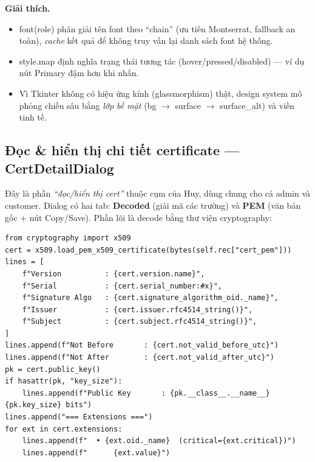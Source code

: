 \documentclass[12pt,a4paper]{article}
\newcommand{\code}[1]{{\ttfamily\small\def\_{\textunderscore\discretionary{}{}{}}#1}}
\begin{document}
\textbf{Giải thích.}
\begin{itemize}
  \item \code{font(role)} phân giải tên font theo ``chain'' (ưu tiên Montserrat,
        fallback an toàn), \emph{cache} kết quả để không truy vấn lại danh sách
        font hệ thống.
  \item \code{style.map} định nghĩa trạng thái tương tác (hover/pressed/disabled)
        — ví dụ nút Primary đậm hơn khi nhấn.
  \item Vì Tkinter không có hiệu ứng kính (glassmorphism) thật, design system mô
        phỏng chiều sâu bằng \emph{lớp bề mặt} (bg $\to$ surface $\to$ surface\_alt)
        và viền tinh tế.
\end{itemize}

\subsection{Đọc \& hiển thị chi tiết certificate — \code{CertDetailDialog}}

Đây là phần \emph{``đọc/hiển thị cert''} thuộc cụm của Huy, dùng chung cho cả
admin và customer. Dialog có hai tab: \textbf{Decoded} (giải mã các trường) và
\textbf{PEM} (văn bản gốc + nút Copy/Save). Phần lõi là decode bằng thư viện
\code{cryptography}:

\begin{Verbatim}
from cryptography import x509
cert = x509.load_pem_x509_certificate(bytes(self.rec["cert_pem"]))
lines = [
    f"Version          : {cert.version.name}",
    f"Serial           : {cert.serial_number:#x}",
    f"Signature Algo   : {cert.signature_algorithm_oid._name}",
    f"Issuer           : {cert.issuer.rfc4514_string()}",
    f"Subject          : {cert.subject.rfc4514_string()}",
]
lines.append(f"Not Before       : {cert.not_valid_before_utc}")
lines.append(f"Not After        : {cert.not_valid_after_utc}")
pk = cert.public_key()
if hasattr(pk, "key_size"):
    lines.append(f"Public Key       : {pk.__class__.__name__} {pk.key_size} bits")
lines.append("=== Extensions ===")
for ext in cert.extensions:
    lines.append(f"  • {ext.oid._name}  (critical={ext.critical})")
    lines.append(f"      {ext.value}")
\end{Verbatim}
\end{document}
